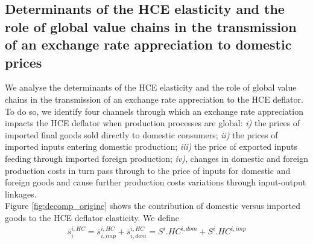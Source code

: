 \documentclass[12pt,a4paper]{paper}
\begin{document}
%

\subsection{Determinants of the HCE elasticity and the role of global value chains in the transmission of an exchange rate appreciation to domestic prices}\label{subsec:channels}

We analyse the determinants of the HCE elasticity and the role of global value chains in the transmission of an exchange rate appreciation to the HCE deflator. 
To do so, we identify four channels through which an exchange rate appreciation impacts the HCE deflator when production processes are global: \textit{i)} the prices of imported ﬁnal goods sold directly to domestic consumers;
\textit{ii)} the prices of imported inputs entering domestic production; 
\textit{iii)} the price of exported inputs feeding through imported foreign production;
\textit{iv)}, changes in domestic and foreign production costs in turn pass through to the price of inputs for domestic and foreign goods and cause further production costs variations through input-output linkages.\\


Figure \ref{fig:decomp_origine} shows the contribution of domestic versus imported goods to the HCE deflator elasticity.
We define 
\begin{eqnarray}
\overline{s}_i^{i,HC}=\overline{s}_{i,imp}^{i,HC} + \overline{s}_{i,dom}^{i,HC} = S^i.HC^{i,dom}+ S^i.HC^{i,imp}
\label{equ:decomp_impexp}
\end{eqnarray}
\end{document}
